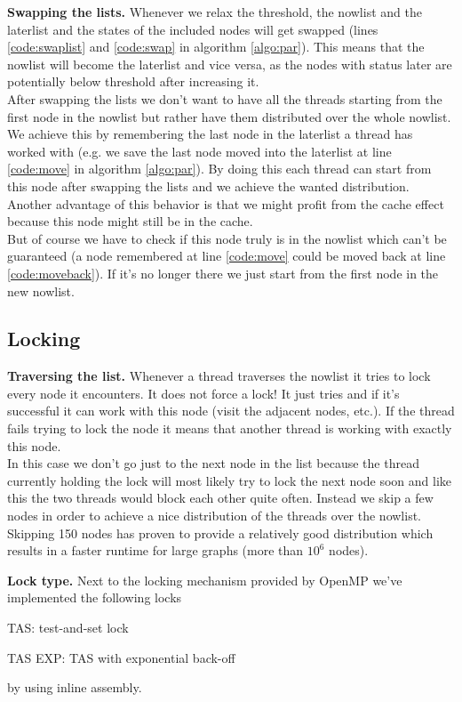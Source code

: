 \documentclass[letterpaper]{article}
\newcommand{\mypar}[1]{{\bf #1.}}
\begin{document}
\mypar{Swapping the lists}
Whenever we relax the threshold, the nowlist and the laterlist and the states of the included nodes will get swapped (lines \ref{code:swaplist} and \ref{code:swap} in algorithm \ref{algo:par}). This means that the nowlist will become the laterlist and vice versa, as the nodes with status later are potentially below threshold after increasing it.\\
After swapping the lists  we don't want to have all the threads starting from the first node in the nowlist but rather have them distributed over the whole nowlist. We achieve this by remembering the last node in the laterlist a thread has worked with (e.g. we save the last node moved into the laterlist at line \ref{code:move} in algorithm \ref{algo:par}). By doing this each thread can start from this node after swapping the lists and we achieve the wanted distribution. Another advantage of this behavior is that we might profit from the cache effect because this node might still be in the cache.\\
But of course we have to check if this node truly is in the nowlist which can't be guaranteed (a node remembered at line \ref{code:move} could be moved back at line \ref{code:moveback}). If it's no longer there we just start from the first node in the new nowlist.

\subsection{Locking}\label{ssec:lock}

\mypar{Traversing the list}
Whenever a thread traverses the nowlist it tries to lock every node it encounters. It does not force a lock! It just tries and if it's successful it can work with this node (visit the adjacent nodes, etc.). If the thread fails trying to lock the node it means that another thread is working with exactly this node.\\
In this case we don't go just to the next node in the list because the thread currently holding the lock will most likely try to lock the next node soon and like this the two threads would block each other quite often. Instead we skip a few nodes in order to achieve a nice distribution of the threads over the nowlist.\\
Skipping 150 nodes has proven to provide a relatively good distribution which results in a faster runtime for large graphs (more than $10^6$ nodes).

\mypar{Lock type}
Next to the locking mechanism provided by OpenMP we've implemented the following locks
\begin{compactitem}
\item TAS: test-and-set lock
\item TAS EXP: TAS with exponential back-off
\end{compactitem}
by using inline assembly.
\end{document}
